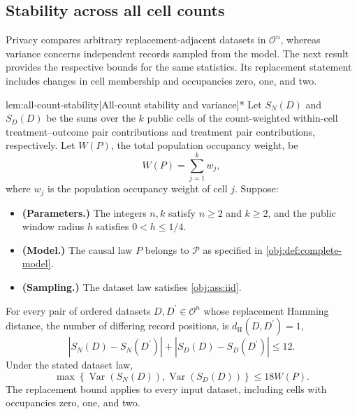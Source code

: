 \subsection{Stability across all cell counts}

Privacy compares arbitrary replacement-adjacent datasets in \(\mathcal O^n\), whereas variance concerns independent records sampled from the model. The next result provides the respective bounds for the same statistics. Its replacement statement includes changes in cell membership and occupancies zero, one, and two.

\begin{lemmav}{lem:all-count-stability}[All-count stability and variance]*
Let \(S_N(D)\) and \(S_D(D)\) be the sums over the \(k\) public cells of the count-weighted within-cell treatment–outcome pair contributions and treatment pair contributions, respectively. Let \(W(P)\), the total population occupancy weight, be
\[
W(P)=\sum_{j=1}^{k}w_j,
\]
where \(w_j\) is the population occupancy weight of cell \(j\). Suppose:
\begin{itemize}
\item \textbf{(Parameters.)} The integers \(n,k\) satisfy \(n\ge2\) and \(k\ge2\), and the public window radius \(h\) satisfies \(0<h\le1/4\).
\item \textbf{(Model.)} The causal law \(P\) belongs to \(\mathcal P\) as specified in \cref{obj:def:complete-model}.
\item \textbf{(Sampling.)} The dataset law satisfies \cref{obj:ass:iid}.
\end{itemize}
For every pair of ordered datasets \(D,D^{\prime}\in\mathcal O^n\) whose replacement Hamming distance, the number of differing record positions, is \(d_{\mathrm H}(D,D^{\prime})=1\),
\[
\left|S_N(D)-S_N(D^{\prime})\right|
+\left|S_D(D)-S_D(D^{\prime})\right|
\le12.
\]
Under the stated dataset law,
\[
\max\left\{
\operatorname{Var}(S_N(D)),
\operatorname{Var}(S_D(D))
\right\}
\le18W(P).
\]
The replacement bound applies to every input dataset, including cells with occupancies zero, one, and two.
\end{lemmav}

